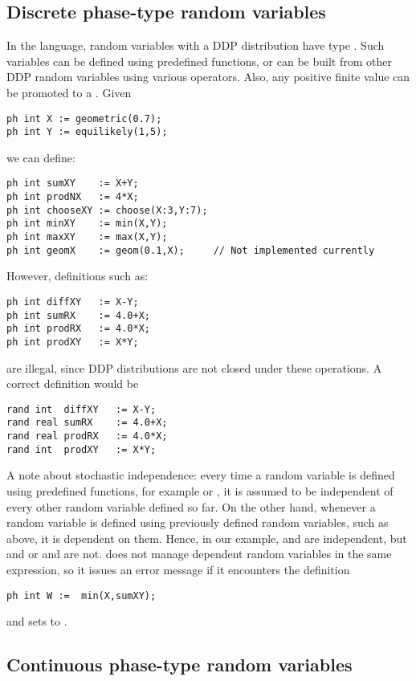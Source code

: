 \subsection{Discrete phase-type random variables}

In the {\smart} language, random variables with a DDP distribution
have type .
Such variables can be defined using predefined functions, or can be built
from other DDP random variables using various operators.
Also, any positive finite  value can be promoted to a .
Given
\begin{lstlisting}
ph int X := geometric(0.7);
ph int Y := equilikely(1,5);
\end{lstlisting}
we can define:
\begin{lstlisting}
ph int sumXY    := X+Y;
ph int prodNX   := 4*X;
ph int chooseXY := choose(X:3,Y:7);
ph int minXY    := min(X,Y);
ph int maxXY    := max(X,Y);
ph int geomX    := geom(0.1,X);     // Not implemented currently
\end{lstlisting}
However, definitions such as:
\begin{lstlisting}
ph int diffXY   := X-Y;
ph int sumRX    := 4.0+X;
ph int prodRX   := 4.0*X;
ph int prodXY   := X*Y;
\end{lstlisting}
are illegal, since DDP distributions are not closed under these
operations.  A correct definition would be
\begin{lstlisting}
rand int  diffXY   := X-Y;
rand real sumRX    := 4.0+X;
rand real prodRX   := 4.0*X;
rand int  prodXY   := X*Y;
\end{lstlisting}

A note about stochastic independence: every time a random variable is defined
using predefined functions, for example 
or , it is assumed to be independent of every other
random variable defined so far.
On the other hand, whenever a random variable is defined using
previously defined random variables, such as  above, it is
dependent on them.
Hence, in our example,  and  are independent, but
 and  or  and  are not.
{\smart} does not manage dependent random variables in the same expression,
so it issues an error message if it encounters the definition
\begin{lstlisting}
ph int W :=  min(X,sumXY);
\end{lstlisting} 
and sets  to .


\subsection{Continuous phase-type random variables}

